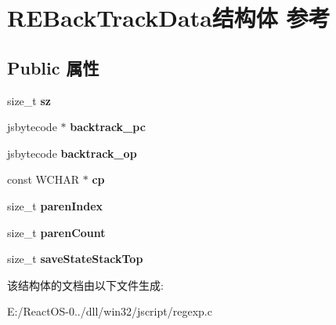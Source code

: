\hypertarget{struct_r_e_back_track_data}{}\section{R\+E\+Back\+Track\+Data结构体 参考}
\label{struct_r_e_back_track_data}
\subsection*{Public 属性}
\begin{DoxyCompactItemize}
\item 
\mbox{\label{struct_r_e_back_track_data_a44417df8282a08193767677a7ea67c4a}} 
size\+\_\+t {\bfseries sz}
\item 
\mbox{\label{struct_r_e_back_track_data_a380225125da112652b48f50866e77de0}} 
jsbytecode $\ast$ {\bfseries backtrack\+\_\+pc}
\item 
\mbox{\label{struct_r_e_back_track_data_a78b5b9b2bb2d3c6ebaa01231ad6db7bc}} 
jsbytecode {\bfseries backtrack\+\_\+op}
\item 
\mbox{\label{struct_r_e_back_track_data_a561ed100c7b3f64bc31b725de99a6ea8}} 
const W\+C\+H\+AR $\ast$ {\bfseries cp}
\item 
\mbox{\label{struct_r_e_back_track_data_a5adec73cdaedf0bd6f7e18d2cea9cbe2}} 
size\+\_\+t {\bfseries paren\+Index}
\item 
\mbox{\label{struct_r_e_back_track_data_a3f59d83d585fd796740b140fba77fa1b}} 
size\+\_\+t {\bfseries paren\+Count}
\item 
\mbox{\label{struct_r_e_back_track_data_aecbd77dc5fda7faf69d2751172b8b08d}} 
size\+\_\+t {\bfseries save\+State\+Stack\+Top}
\end{DoxyCompactItemize}


该结构体的文档由以下文件生成\+:\begin{DoxyCompactItemize}
\item 
E\+:/\+React\+O\+S-\/0../dll/win32/jscript/regexp.\+c\end{DoxyCompactItemize}
